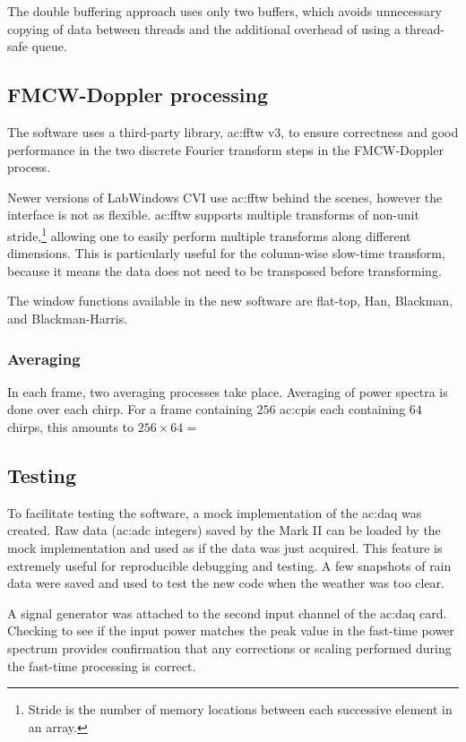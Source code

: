 \documentclass{article}
\begin{document}
The double buffering approach uses only two buffers, which avoids unnecessary copying of data between threads and the additional overhead of using a thread-safe queue.

\subsection{FMCW-Doppler processing}
The software uses a third-party library, \acrshort{ac:fftw} v3\cite{FFTWv3}, to ensure correctness and good performance in the two discrete Fourier transform steps in the FMCW-Doppler process.

Newer versions of LabWindows CVI use \acrshort{ac:fftw} behind the scenes, however the interface is not as flexible. \acrshort{ac:fftw} supports multiple transforms of non-unit stride,\footnote{Stride is the number of memory locations between each successive element in an array.} allowing one to easily perform multiple transforms along different dimensions. This is particularly useful for the column-wise slow-time transform, because it means the data does not need to be transposed before transforming.


The window functions available in the new software are flat-top, Han, Blackman, and Blackman-Harris.

\subsubsection{Averaging}
In each frame, two averaging processes take place. Averaging of power spectra is done over each chirp. For a frame containing \(256\) \acrshort{ac:cpi}s each containing \(64\) chirps, this amounts to \(256 \times 64 = \)

\subsection{Testing}
To facilitate testing the software, a mock implementation of the \acrshort{ac:daq} was created. Raw data (\acrshort{ac:adc} integers) saved by the Mark II can be loaded by the mock implementation and used as if the data was just acquired. This feature is extremely useful for reproducible debugging and testing. A few snapshots of rain data were saved and used to test the new code when the weather was too clear.

A signal generator was attached to the second input channel of the \acrshort{ac:daq} card. Checking to see if the input power matches the peak value in the fast-time power spectrum provides confirmation that any corrections or scaling performed during the fast-time processing is correct.
\end{document}
